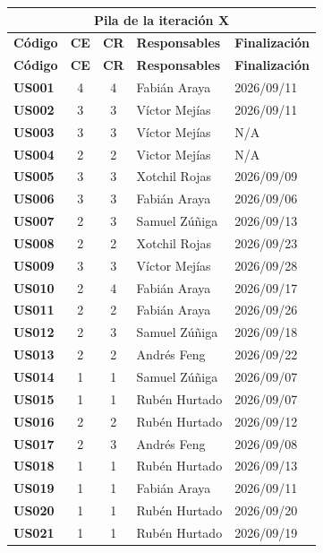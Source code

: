 
\begin{longtable}{|l||c|c|p{7cm}|l|}

\multicolumn{5}{c}{Pila de la \textbf{iteración X} }\\
\hline\hline
\textbf{Código} & \textbf{CE} & \textbf{CR} & \textbf{Responsables} & \textbf{Finalización} \\
\hline
\endfirsthead
\textbf{Código} & \textbf{CE} & \textbf{CR} & \textbf{Responsables} & \textbf{Finalización} \\
\hline\hline
\endhead

\textbf{US001} & 4 & 4 & Fabián Araya & 2026/09/11 \\
\textbf{US002} & 3 & 3 & Víctor Mejías & 2026/09/11 \\
\textbf{US003} & 3 & 3 & Víctor Mejías & N/A \\
\textbf{US004} & 2 & 2 & Victor Mejías & N/A \\
\textbf{US005} & 3 & 3 & Xotchil Rojas & 2026/09/09 \\
\textbf{US006} & 3 & 3 & Fabián Araya & 2026/09/06 \\
\textbf{US007} & 2 & 3 & Samuel Zúñiga & 2026/09/13 \\
\textbf{US008} & 2 & 2 & Xotchil Rojas & 2026/09/23 \\
\textbf{US009} & 3 & 3 & Víctor Mejías & 2026/09/28 \\
\textbf{US010} & 2 & 4 & Fabián Araya & 2026/09/17 \\
\textbf{US011} & 2 & 2 & Fabián Araya & 2026/09/26 \\
\textbf{US012} & 2 & 3 & Samuel Zúñiga & 2026/09/18 \\
\textbf{US013} & 2 & 2 & Andrés Feng & 2026/09/22 \\
\textbf{US014} & 1 & 1 & Samuel Zúñiga & 2026/09/07 \\
\textbf{US015} & 1 & 1 & Rubén Hurtado & 2026/09/07 \\
\textbf{US016} & 2 & 2 & Rubén Hurtado & 2026/09/12 \\
\textbf{US017} & 2 & 3 & Andrés Feng & 2026/09/08 \\
\textbf{US018} & 1 & 1 & Rubén Hurtado & 2026/09/13 \\
\textbf{US019} & 1 & 1 & Fabián Araya & 2026/09/11 \\
\textbf{US020} & 1 & 1 & Rubén Hurtado & 2026/09/20 \\
\textbf{US021} & 1 & 1 & Rubén Hurtado & 2026/09/19 \\

\end{longtable}
